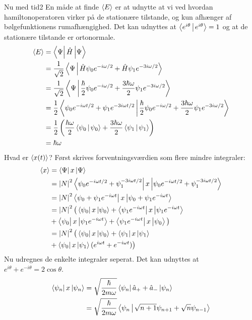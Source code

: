 \begin{opgave}{Nu med tid}{2}
En måde at finde $\left< E \right>$ er at udnytte at vi ved hvordan hamiltonoperatoren virker på de stationære tilstande, og kun afhænger af bølgefunktionens rumafhængighed. Det kan udnyttes at $\braket{e^{i\theta}}{e^{i\theta}}=1$ og at de stationære tilstande er ortonormale.
\begin{align*}
    \expect E &= \matrixel{\Psi}{\op H}{\Psi}\\
    &=\frac{1}{\sqrt{2}}\braket{\Psi}{\op H\psi_0e^{-i\omega/2}+\op H\psi_1e^{-3i\omega/2}}\\
    &=\frac{1}{\sqrt{2}}\braket{\Psi}{\frac{\hbar}{2}\psi_0e^{-i\omega/2}+\frac{3\hbar\omega}{2}\psi_1e^{-3i\omega/2}}\\
    &= \frac{1}{2}\braket{\psi_0 e^{-i\omega t/2}+\psi_1e^{-3i\omega t/2}}{\frac{\hbar}{2}\psi_0e^{-i\omega/2}+\frac{3\hbar\omega}{2}\psi_1e^{-3i\omega/2}}\\
    &=\frac{1}{2}\left(\frac{\hbar \omega}{2}\braket{\psi_0}{\psi_0}+\frac{3\hbar\omega}{2}\braket{\psi_1}{\psi_1}\right)\\
    &=\hbar\omega
\end{align*}
\opg Hvad er $\left< x(t) \right>$?
Først skrives forventningsværdien som flere mindre integraler:
\begin{align*}
    \expect x &= \matrixel{\Psi}{x}{\Psi}\\
    &=\abs N^2 \matrixel{\psi_0e^{-i\omega t/2}+\psi_1^{-3i\omega t/2}}{x}{\psi_0e^{-i\omega t/2}+\psi_1^{-3i\omega t/2}}\\
    &= \abs N^2 \matrixel{\psi_0 + \psi_1 e^{-i\omega t}}{x}{\psi_0+\psi_1e^{-i\omega t}}\\
    &= \abs N^2 \big(\matrixel{\psi_0}{x}{\psi_0}+\matrixel{\psi_1e^{-i\omega t}}{x}{\psi_1e^{-i\omega t}}\\
    &+ \matrixel{\psi_0}{x}{\psi_1e^{-i\omega t}}+\matrixel{\psi_1e^{-i\omega t}}{x}{\psi_0}\big)\\
    &=\abs N^2 \big (\matrixel{\psi_0}{x}{\psi_0}+\matrixel{\psi_1}{x}{\psi_1}\\
    &+\matrixel{\psi_0}{x}{\psi_1}(e^{i\omega t}+e^{-i\omega t})\big )
\end{align*}
Nu udregnes de enkelte integraler seperat. Det kan udnyttes at $e^{i\theta}+e^{-i\theta} = 2\cos \theta$.
\begin{align*}
    \matrixel{\psi_n}{x}{\psi_n} &= \sqrt{\frac{\hbar}{2m\omega}}\matrixel{\psi_n}{\op a_++\op a_-}{\psi_n}\\
    &= \sqrt{\frac{\hbar}{2m\omega}}\braket{\psi_n}{\sqrt{n+1}\psi_{n+1}+\sqrt{n}\psi_{n-1}}\\

\end{align*}
\end{opgave}
